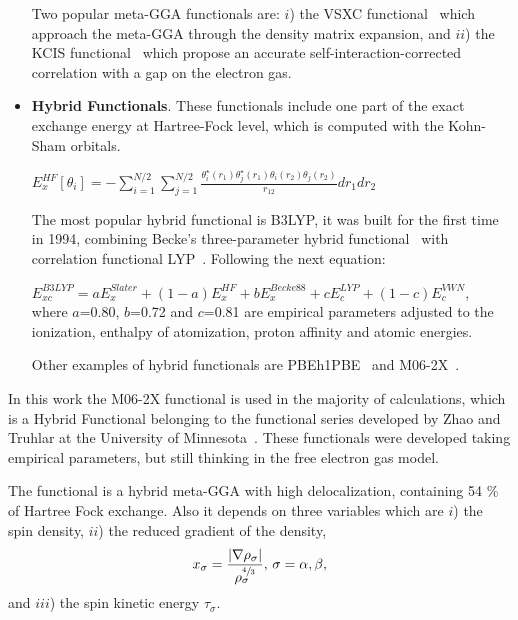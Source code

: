 \begin{itemize}
Two popular meta-GGA functionals are: $i$) the VSXC
functional~\cite{VanVoorhis1998} which approach the meta-GGA through the
density matrix expansion, and $ii$) the KCIS functional~\cite{1999} which
propose an accurate self-interaction-corrected correlation with a gap on the
electron gas.


\item \textbf{Hybrid Functionals}.  These functionals include one part of the
exact exchange energy at Hartree-Fock level, which is computed with the
Kohn-Sham orbitals.

$E_{x}^{HF} [\theta_{i}] = -\displaystyle\sum_{i=1}^{N/2}\displaystyle\sum_{j=1}^{N/2}
\displaystyle\frac{\theta_{i}^{\star}(r_{1}) \theta_{j}^{\star}(r_{1}) \theta_{i}(r_{2}) \theta_{j}(r_{2})}
{r_{12}} dr_{1}dr_{2}$

The most popular hybrid functional is B3LYP, it was built for the first time in
1994, combining Becke's three-parameter hybrid functional~\cite{Becke1993} with
correlation functional LYP~\cite{Lee1988}. Following the next equation:

$E_{xc}^{B3LYP} = aE_{x}^{Slater} + (1-a)E_{x}^{HF} +bE_{x}^{Becke88}
+cE_{c}^{LYP} +(1-c)E_{c}^{VWN}$,\\

where $a$=0.80, $b$=0.72 and $c$=0.81 are empirical parameters adjusted to the
ionization, enthalpy of atomization, proton affinity and atomic energies.

Other examples of hybrid functionals are PBEh1PBE~\cite{Ernzerhof1998} and
M06-2X~\cite{Zhao2007}. 

\end{itemize}

In this work the M06-2X functional is used in the majority of calculations,
which is a Hybrid Functional belonging to the functional series developed by
Zhao and Truhlar at the University of Minnesota~\cite{Zhao2007}. These
functionals were developed taking empirical parameters, but still thinking in
the free electron gas model.

The functional is a hybrid meta-GGA with high delocalization, containing 54 \%
of Hartree Fock exchange. Also it depends on three variables which are $i$) the
spin density, $ii$) the reduced gradient of the density,
\begin{align}
  x_{\sigma} = \frac{|\nabla \rho_\sigma|}{\rho^{\sfrac43}_{\sigma}}, \, \sigma=\alpha,\beta,
\end{align}
and $iii$) the spin kinetic energy $\tau_\sigma$.

